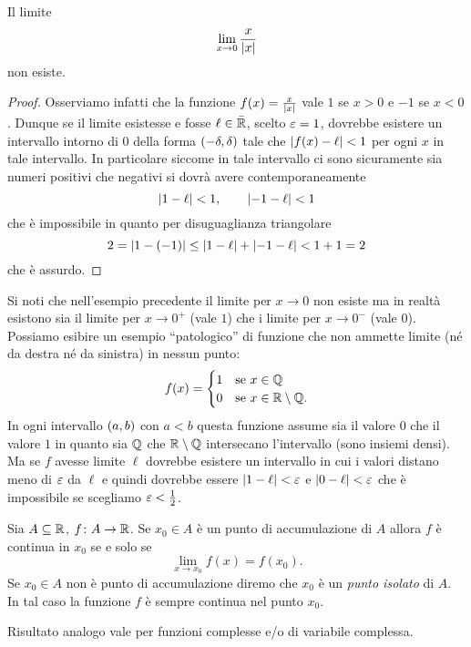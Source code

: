\begin{example}
Il limite 
\[
  \lim_{x\to 0} \frac{x}{{\left|x\right|}}
\]
non esiste. 
\end{example}
\begin{proof}
Osserviamo infatti che la funzione $f(x) = \frac{x}{{\left|x\right|}}$ 
vale $1$ se $x>0$ e $-1$ se $x<0$.
Dunque se il limite esistesse e fosse $\ell\in \bar {{\mathbb R}}$, 
scelto $\varepsilon=1$, dovrebbe esistere un intervallo intorno di $0$ 
della forma $\left(-\delta,\delta\right)$ tale che 
${\left|f(x)-\ell\right|}<1$ per ogni $x$ in tale intervallo.
In particolare siccome in tale intervallo ci sono sicuramente 
sia numeri positivi che negativi si dovrà avere 
contemporaneamente
\[
  {\left|1-\ell\right|}<1, \qquad 
  {\left|-1-\ell\right|}<1  
\]
che è impossibile in quanto per disuguaglianza triangolare 
\[
 2 = {\left|1-(-1)\right|} 
 \le {\left|1-\ell\right|} + {\left|-1-\ell\right|}
 < 1 + 1 = 2
\]
che è assurdo.
\end{proof}

Si noti che nell'esempio precedente il limite per $x\to 0$ 
non esiste ma in realtà esistono sia il limite per $x\to 0^+$ 
(vale $1$) che i limite per $x\to 0^-$ (vale $0$).
Possiamo esibire un esempio ``patologico'' di funzione 
che non ammette limite (né da destra né da sinistra)
in nessun punto:
\[
  f(x) = 
  \begin{cases}
     1 & \text{se $x\in {\mathbb Q}$}\\ 
     0 & \text{se $x\in {\mathbb R}\setminus {\mathbb Q}$}.
  \end{cases}
\]
In ogni intervallo $\left(a,b\right)$ con $a<b$ questa funzione 
assume sia il valore $0$ che il valore $1$ 
in quanto sia ${\mathbb Q}$ che ${\mathbb R}\setminus {\mathbb Q}$ intersecano 
l'intervallo (sono insiemi densi).
Ma se $f$ avesse limite $\ell$ dovrebbe esistere un intervallo 
in cui i valori distano meno di $\varepsilon$ da $\ell$ e quindi 
dovrebbe essere ${\left|1-\ell\right|}<\varepsilon$ e ${\left|0-\ell\right|}<\varepsilon$
che è impossibile se scegliamo $\varepsilon < \frac 1 2$.

\begin{theorem}%
\mymark{***}%
  Sia $A\subseteq {\mathbb R}$, $f\colon A \to {\mathbb R}$. 
  Se $x_0\in A$ è un punto di accumulazione di $A$
  allora $f$ è continua in $x_0$ se e solo se
  \[
    \lim_{x\to x_0}f(x) = f(x_0).
  \]
  Se $x_0\in A$ non è punto di accumulazione diremo 
  che $x_0$ è un \emph{punto isolato}%
%
 di $A$.
  In tal caso la funzione $f$ è sempre continua nel punto $x_0$.

Risultato analogo vale per funzioni complesse e/o di variabile complessa.
\end{theorem}
  
